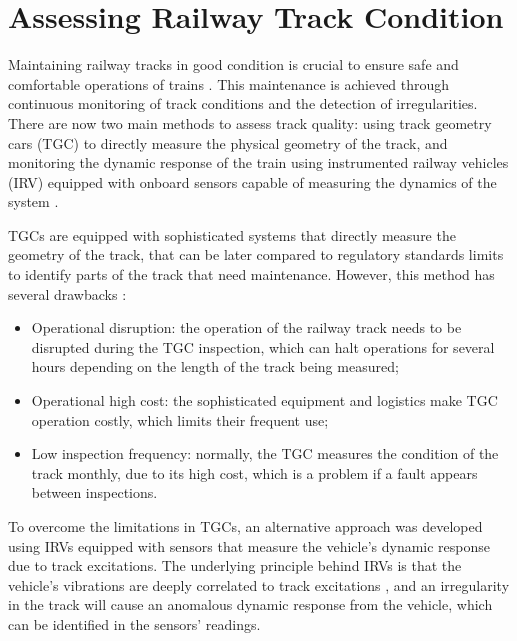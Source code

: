 \section{Assessing Railway Track Condition} \label{sec-assessing-railway-track}

Maintaining railway tracks in good condition is crucial to ensure safe and comfortable operations of trains \cite{Tsunashima-2019,GHIASI2025109516}. This maintenance is achieved through continuous monitoring of track conditions and the detection of irregularities. There are now two main methods to assess track quality: using track geometry cars (TGC) to directly measure the physical geometry of the track, and monitoring the dynamic response of the train using instrumented railway vehicles (IRV) equipped with onboard sensors capable of measuring the dynamics of the system \cite{PIRES2024107191}.

TGCs are equipped with sophisticated systems that directly measure the geometry of the track, that can be later compared to regulatory standards limits to identify parts of the track that need maintenance. However, this method has several drawbacks \cite{PIRES2024107191,GHIASI2025109516,Hironori_ONO202322-00239}:
\begin{itemize}
    \item Operational disruption: the operation of the railway track needs to be disrupted during the TGC inspection, which can halt operations for several hours depending on the length of the track being measured;
    \item Operational high cost: the sophisticated equipment and logistics make TGC operation costly, which limits their frequent use;
    \item Low inspection frequency: normally, the TGC measures the condition of the track monthly, due to its high cost, which is a problem if a fault appears between inspections.
\end{itemize}

To overcome the limitations in TGCs, an alternative approach was developed using IRVs equipped with sensors that measure the vehicle's dynamic response due to track excitations. The underlying principle behind IRVs is that the vehicle's vibrations are deeply correlated to track excitations \cite{PIRES2024107191,Tsunashima-2019}, and an irregularity in the track will cause an anomalous dynamic response from the vehicle, which can be identified in the sensors' readings.

